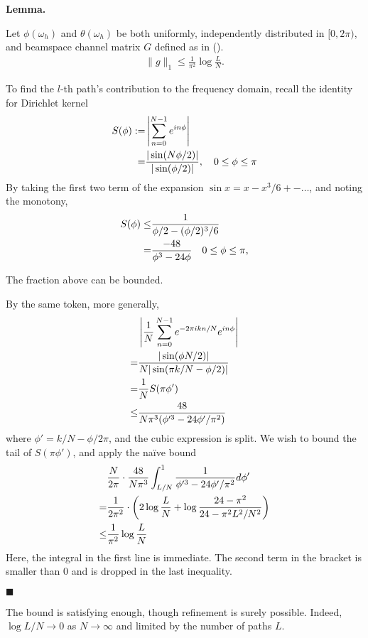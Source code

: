 \documentclass[12pt]{article}
\newcounter{NumResult}
\newcommand{\myCount}
{
   \stepcounter{NumResult}
   \textbf{\arabic{NumResult}}
}
\newcommand {\Result} [2]
{
   \bigskip
   \myCount \textbf{#1} \par
   {#2} \par
   \hfill \(\blacksquare\)
   \bigskip
}
\begin{document}
\Result
{Lemma.}
{
Let \(\phi(\omega_h)\) and \(\theta(\omega_h)\) be both uniformly, independently distributed in \([0,2\pi)\), and beamspace channel matrix \(G\) defined as in ().
\begin{gather}
\|g\|_1 \leq \frac{1}{\pi^2} \log \frac{L}{N}.
\end{gather}

To find the \(l\)-th path's contribution to the frequency domain, recall the identity for Dirichlet kernel
\begin{align}
S(\phi)
:=&\left| \sum_{n=0}^{N-1} e^{i n \phi} \right| \\ \notag
=&\frac{|\sin(N \phi/2)|}{|\sin(\phi /2)|},
\quad 0 \leq \phi \leq \pi
\end{align}
By taking the first two term of the expansion \(\sin x =x -x^3/6 +- \dotsc\), and noting the monotony, 
\begin{align}
S(\phi)
\leq& \frac{1}{\phi/2 -(\phi/2)^3/6} \\ \notag
=& \frac{-48}{\phi^3 -24\phi}
\quad 0 \leq \phi \leq \pi,
\end{align}

The fraction above can be bounded.

By the same token, more generally,
\begin{align}
&\left| \frac{1}{N} \sum_{n=0}^{N-1} e^{-2\pi i k n/N} e^{i n \phi} \right| \\ \notag
=&\frac{|\sin( \phi N /2 )|}{N |\sin( \pi k /N -\phi /2 )|} \\ \notag
=&\frac{1}{N} S(\pi \phi') \\ \notag
\leq& \frac{48}{N \pi^3 (\phi'^3 -24 \phi' /\pi^2)}
\end{align}
where \(\phi' =k/N -\phi/2\pi\), and the cubic expression is split.
We wish to bound the tail of \(S(\pi \phi')\), and apply the na\"ive bound
\begin{align}
&\frac{N}{2\pi} \cdot \frac{48}{N \pi^3} \int_{L/N}^1 \frac{1}{\phi'^3 -24 \phi' /\pi^2}
 d\phi' \\ \notag
=&\frac{1}{2\pi^2} \cdot \left( 2 \log \frac{L}{N} +\log \frac{24-\pi^2}{24-\pi^2 L^2 /N^2} \right) \\ \notag
\leq& \frac{1}{\pi^2} \log \frac{L}{N}
\end{align}
Here, the integral in the first line is immediate.
The second term in the bracket is smaller than 0 and is dropped in the last inequality.
}

The bound is satisfying enough, though refinement is surely possible.
Indeed, \(\log L/N \to 0\) as \(N \to \infty\) and limited by the number of paths \(L\).
\end{document}
